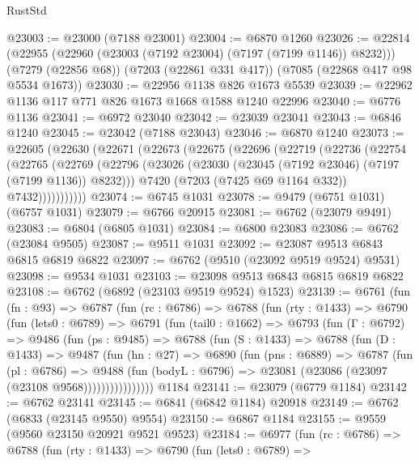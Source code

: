 \begin{lexlean}{RustStd}
\begin{coremodule}
@23003 := @23000 (@7188 @23001)
@23004 := @6870 @1260
@23026 := @22814
    (@22955 (@22960 (@23003 (@7192 @23004) (@7197 (@7199 @1146)) @8232)))
    (@7279 (@22856 @68))
    (@7203 (@22861 @331 @417))
    (@7085 (@22868 @417 @98 @5534 @1673))
@23030 := @22956 @1138 @826 @1673 @5539
@23039 := @22962 @1136 @117 @771 @826 @1673 @1668 @1588 @1240 @22996
@23040 := @6776 @1136
@23041 := @6972 @23040
@23042 := @23039 @23041
@23043 := @6846 @1240
@23045 := @23042 (@7188 @23043)
@23046 := @6870 @1240
@23073 := @22605
    (@22630
      (@22671
        (@22673
          (@22675
            (@22696
              (@22719
                (@22736
                  (@22754
                    (@22765
                      (@22769
                        (@22796
                          (@23026 (@23030 (@23045 (@7192 @23046) (@7197 (@7199 @1136)) @8232)))
                          @7420
                          (@7203 (@7425 @69 @1164 @332))
                          @7432)))))))))))
@23074 := @6745 @1031
@23078 := @9479 (@6751 @1031) (@6757 @1031)
@23079 := @6766 @20915
@23081 := @6762 (@23079 @9491)
@23083 := @6804 (@6805 @1031)
@23084 := @6800 @23083
@23086 := @6762 (@23084 @9505)
@23087 := @9511 @1031
@23092 := @23087 @9513 @6843 @6815 @6819 @6822
@23097 := @6762 (@9510 (@23092 @9519 @9524) @9531)
@23098 := @9534 @1031
@23103 := @23098 @9513 @6843 @6815 @6819 @6822
@23108 := @6762 (@6892 (@23103 @9519 @9524) @1523)
@23139 := @6761
    (fun (fn : @93) =>
    @6787
      (fun (rc : @6786) =>
      @6788
        (fun (rty : @1433) =>
        @6790
          (fun (lets0 : @6789) =>
          @6791
            (fun (tail0 : @1662) =>
            @6793
              (fun (Γ : @6792) =>
              @9486
                (fun (ps : @9485) =>
                @6788
                  (fun (S : @1433) =>
                  @6788
                    (fun (D : @1433) =>
                    @9487
                      (fun (hn : @27) =>
                      @6890
                        (fun (pns : @6889) =>
                        @6787
                          (fun (pl : @6786) =>
                          @9488
                            (fun (bodyL : @6796) =>
                            @23081 (@23086 (@23097 (@23108 @9568))))))))))))))))
    @1184
@23141 := @23079 (@6779 @1184)
@23142 := @6762 @23141
@23145 := @6841 (@6842 @1184) @20918
@23149 := @6762 (@6833 (@23145 @9550) @9554)
@23150 := @6867 @1184
@23155 := @9559 (@9560 @23150 @20921 @9521 @9523)
@23184 := @6977
    (fun (rc : @6786) =>
    @6788
      (fun (rty : @1433) =>
      @6790
        (fun (lets0 : @6789) =>

\end{coremodule}
\end{lexlean}

